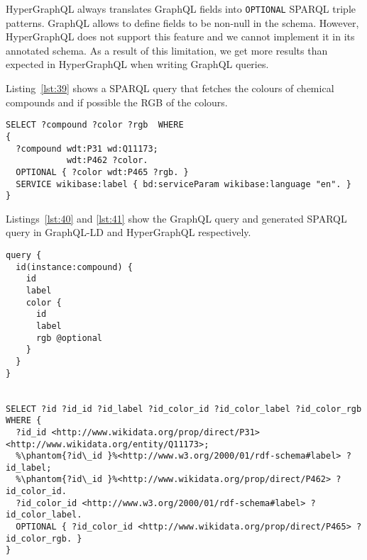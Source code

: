HyperGraphQL always translates GraphQL fields into \texttt{OPTIONAL} SPARQL triple patterns. GraphQL allows to define fields to be non-null in the schema. However, HyperGraphQL does not support this feature and we cannot implement it in its annotated schema. As a result of this limitation, we get more results than expected in HyperGraphQL when writing GraphQL queries. 

Listing~\ref{lst:39} shows a SPARQL query that fetches the colours of chemical compounds and if possible the RGB of the colours.

\begin{minipage}{\linewidth}
\begin{lstlisting}[label=lst:39, caption={SPARQL query showing usage of OPTIONAL feature}, language=SPARQL]
SELECT ?compound ?color ?rgb  WHERE
{
  ?compound wdt:P31 wd:Q11173;
            wdt:P462 ?color.
  OPTIONAL { ?color wdt:P465 ?rgb. }
  SERVICE wikibase:label { bd:serviceParam wikibase:language "en". }
}
\end{lstlisting}
\end{minipage}

Listings~\ref{lst:40} and \ref{lst:41} show the GraphQL query and generated SPARQL query in GraphQL-LD and HyperGraphQL respectively.

\begin{minipage}{\linewidth}
\begin{lstlisting}[columns=fullflexible, label=lst:40, caption={GraphQL query and generated SPARQL query in GraphQL-LD}, language=SPARQL]
query {
  id(instance:compound) {
    id
    label
    color {
      id
      label
      rgb @optional
    }
  }
}


SELECT ?id ?id_id ?id_label ?id_color_id ?id_color_label ?id_color_rgb WHERE {
  ?id_id <http://www.wikidata.org/prop/direct/P31> <http://www.wikidata.org/entity/Q11173>;
  %\phantom{?id\_id }%<http://www.w3.org/2000/01/rdf-schema#label> ?id_label;
  %\phantom{?id\_id }%<http://www.wikidata.org/prop/direct/P462> ?id_color_id.
  ?id_color_id <http://www.w3.org/2000/01/rdf-schema#label> ?id_color_label.
  OPTIONAL { ?id_color_id <http://www.wikidata.org/prop/direct/P465> ?id_color_rgb. }      
}
\end{lstlisting}
\end{minipage}



